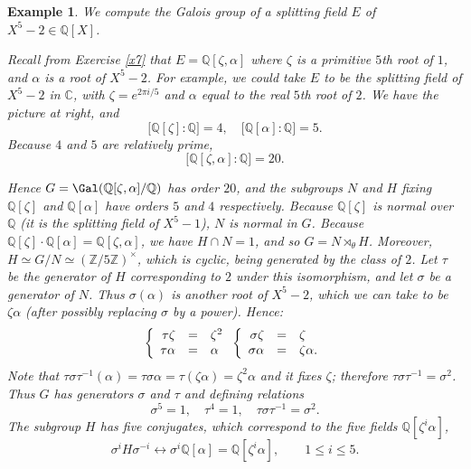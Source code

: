 \documentclass[a4paper,11pt,final,openany]{memoir}
\newtheorem{example}[X]{Example}
\theoremstyle{nonumberplain}
\begin{document}
\begin{example}
\label{ft20}We compute the Galois group of a splitting field $E$ of
$X^{5}-2\in\mathbb{Q}[X]$.

Recall from Exercise \ref{x7} that $E=\mathbb{Q}[\zeta
,\alpha]$ where $\zeta$ is a primitive $5$th root of $1$, and
$\alpha$ is a root of $X^{5}-2$. For example, we could take $E$ to be the
splitting field of $X^{5}-2$ in $\mathbb{C}$, with $\zeta=e^{2\pi i/5}$ and
$\alpha$ equal to the real $5$th root of $2$. We have the picture at
right, and
\[
\lbrack\mathbb{Q}[\zeta]:\mathbb{Q}]=4,\quad\lbrack\mathbb{Q}[\alpha
]:\mathbb{Q}]=5.
\]
Because $4$ and $5$ are relatively prime,
\[
\lbrack\mathbb{Q}[\zeta,\alpha]:\mathbb{Q}]=20.
\]
{}

\begin{minipage}{2.0in}
\end{minipage}

Hence $G=\Gal(\mathbb{Q}[\zeta,\alpha]/\mathbb{Q})$ has order $20$, and the
subgroups $N$ and $H$ fixing $\mathbb{Q}[\zeta]$ and $\mathbb{Q}[\alpha]$ have
orders $5$ and $4$ respectively. Because $\mathbb{Q}[\zeta]$ is normal over
$\mathbb{Q}$ (it is the splitting field of $X^{5}-1$), $N$ is normal in $G$.
Because $\mathbb{Q}[\zeta]\cdot\mathbb{Q}[\alpha]=\mathbb{Q}[\zeta,\alpha]$,
we have $H\cap N=1$, and so $G=N\rtimes_{\theta}H$. Moreover, $H\simeq
G/N\simeq(\mathbb{Z}/5\mathbb{Z})^{\times}$, which is cyclic, being generated
by the class of $2$. Let $\tau$ be the generator of $H$ corresponding to $2$
under this isomorphism, and let $\sigma$ be a generator of $N$. Thus
$\sigma(\alpha)$ is another root of $X^{5}-2$, which we can take to be
$\zeta\alpha$ (after possibly replacing $\sigma$ by a power). Hence:
\[
\left\{
\begin{array}
[c]{rcl}%
\tau\zeta & = & \zeta^{2}\\
\tau\alpha & = & \alpha
\end{array}
\right.  \left\{
\begin{array}
[c]{rcl}%
\sigma\zeta & = & \zeta\\
\sigma\alpha & = & \zeta\alpha.
\end{array}
\right.
\]
Note that $\tau\sigma\tau^{-1}(\alpha)=\tau\sigma\alpha=\tau(\zeta
\alpha)=\zeta^{2}\alpha$ and it fixes $\zeta$; therefore $\tau\sigma\tau
^{-1}=\sigma^{2}$. Thus $G$ has generators $\sigma$ and $\tau$ and defining
relations
\[
\sigma^{5}=1,\quad\tau^{4}=1,\quad\tau\sigma\tau^{-1}=\sigma^{2}.
\]
The subgroup $H$ has five conjugates, which correspond to the five fields
$\mathbb{Q}[\zeta^{i}\alpha]$,
\[
\sigma^{i}H\sigma^{-i}\leftrightarrow\sigma^{i}\mathbb{Q}[\alpha
]=\mathbb{Q}[\zeta^{i}\alpha],\qquad1\leq i\leq5.
\]


\end{example}
\end{document}
